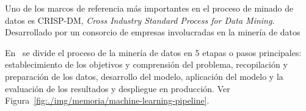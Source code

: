 Uno de los marcos de referencia más importantes en el proceso de minado de datos es CRISP-DM, \textit{Cross Industry Standard Process for Data Mining}. Desarrollado por un consorcio de empresas involucradas en la minería de datos~\cite{Chapman2000CRISPDM1S}


En~\cite{KOTU201517} se divide el proceso de la minería de datos en 5 etapas o pasos principales: establecimiento de los objetivos y comprensión del problema, recopilación y preparación de los datos, desarrollo del modelo, aplicación del modelo y la evaluación de los resultados y despliegue en producción. Ver Figura~\ref{fig:./img/memoria/machine-learning-pipeline}.


